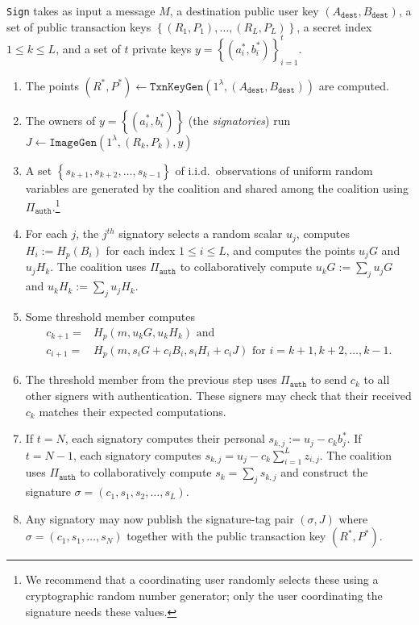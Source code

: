 \documentclass{mrl}
\theoremstyle{definition}
\begin{document}
\texttt{Sign} takes as input a message $M$, a destination public user key $(A_{\texttt{dest}}, B_{\texttt{dest}})$, a set of public transaction keys $\left\{(R_1, P_1), \ldots, (R_L, P_L)\right\}$, a secret index $1 \leq k \leq L$, and a set of $t$ private keys $y=\left\{(a^*_i, b^*_i)\right\}_{i=1}^{t}$.
\begin{enumerate}[(1)]
\item The points $(R^*, P^*) \leftarrow \texttt{TxnKeyGen}(1^\lambda, (A_{\texttt{dest}}, B_{\texttt{dest}}))$ are computed.
\item The owners of $y=\left\{(a^*_i, b^*_i)\right\}$ (the \textit{signatories}) run $J \leftarrow \texttt{ImageGen}(1^\lambda, (R_k, P_k), y)$
\item A set $\left\{s_{k+1}, s_{k+2}, \ldots, s_{k-1}\right\}$ of i.i.d.\ observations of uniform random variables are generated by the coalition and shared among the coalition using $\Pi_{\texttt{auth}}$.\footnote{We recommend that a coordinating user randomly selects these using a cryptographic random number generator; only the user coordinating the signature needs these values.}
\item For each $j$, the $j^{th}$ signatory selects a random scalar $u_{j}$, computes $H_i:=H_{p}(B_i)$ for each index $1 \leq i \leq L$, and computes the points $u_jG$ and $u_jH_{k}$. The coalition uses $\Pi_{\texttt{auth}}$ to collaboratively compute $u_{k}G := \sum_j u_j G$ and $u_k H_k:= \sum_j u_j H_{k}$.

\item Some threshold member computes 
\begin{align*}
    c_{k+1} =& H_{p}(m, u_{k} G, u_{k} H_{k})\text{ and }\\
    c_{i+1} =& H_{p}(m, s_i G + c_i B_i, s_i H_{i} + c_i J)\text{ for }i=k+1, k+2, \ldots, k-1.
\end{align*}
\item The threshold member from the previous step uses $\Pi_{\texttt{auth}}$ to send $c_{k}$ to all other signers with authentication. These signers may check that their received $c_k$ matches their expected computations.
\item If $t=N$, each signatory computes their personal $s_{k,j} := u_j - c_{k} b_j^*$. If $t=N-1$, each signatory computes $s_{k,j} = u_j - c_{k} \sum_{i=1}^{L}z_{i,j}$. The coalition uses $\Pi_{\texttt{auth}}$ to collaboratively compute $s_k = \sum_j s_{k,j}$ and construct the signature $\sigma = (c_1, s_1, s_2, \ldots, s_L)$.
\item Any signatory may now publish the signature-tag pair $(\sigma, J)$ where $\sigma=(c_1, s_1, \ldots, s_N)$ together with the public transaction key $(R^*, P^*)$.
 \end{enumerate}
 
\end{document}
